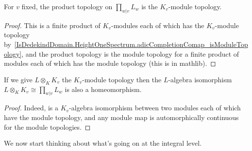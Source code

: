 \begin{theorem}
  \label{IsDedekindDomain.HeightOneSpectrum.prodAdicCompletionComap_isModuleTopology}
  \leanok
  For $v$ fixed, the product topology on $\prod_{w|v}L_w$ is the $K_v$-module
  topology.
\end{theorem}
\begin{proof}
  This is a finite product of $K_v$-modules each of which has the $K_v$-module topology
  by~\ref{IsDedekindDomain.HeightOneSpectrum.adicCompletionComap_isModuleTopology},
  and the product topology is the module topology for a finite product of modules each of which
  has the module topology (this is in mathlib).
\end{proof}

\begin{theorem}
  \label{IsDedekindDomain.HeightOneSpectrum.adicCompletionComapContinuousAlgEquiv}
  If we give $L\otimes_KK_v$ the $K_v$-module topology then the $L$-algebra isomorphism
  $L\otimes_K K_v\cong\prod_{w|v}L_w$ is also a homeomorphism.
\end{theorem}
\begin{proof} Indeed, is a $K_v$-algebra isomorphism between two modules each of which
  have the module topology, and any module map is automorphically continuous for the
  module topologies.
\end{proof}

We now start thinking about what's going on at the integral level.

